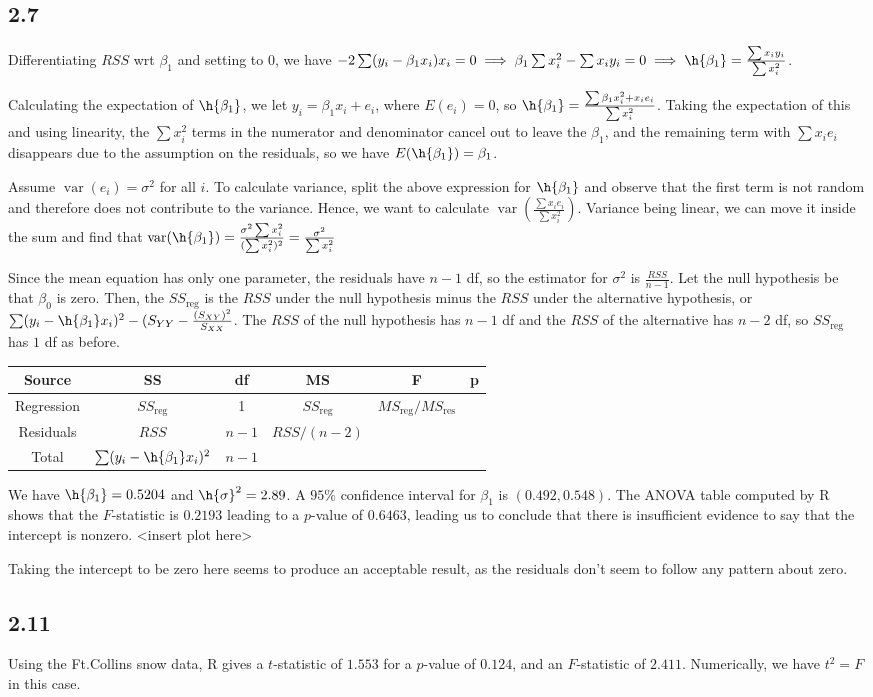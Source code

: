 \documentclass{article}
\DeclareMathOperator{\var}{var}
\begin{document}
\subsection*{2.7}
Differentiating $RSS$ wrt $\beta_1$ and setting to $0$, we have $-2\sum(y_i-\beta_1x_i)x_i=0\implies \beta_1\sum x_i^2-\sum x_iy_i=0\implies \h{\beta_1}=\frac{\sum x_iy_i}{\sum x_i^2}$.

Calculating the expectation of $\h{\beta_1}$, we let $y_i=\beta_1x_i+e_i$, where $E(e_i)=0$, so $\h{\beta_1}=\frac{\sum \beta_1x_i^2+x_ie_i}{\sum x_i^2}$. Taking the expectation of this and using linearity, the $\sum x_i^2$ terms in the numerator and denominator cancel out to leave the $\beta_1$, and the remaining term with $\sum x_ie_i$ disappears due to the assumption on the residuals, so we have $E(\h{\beta_1})=\beta_1$.

Assume $\var(e_i)=\sigma^2$ for all $i$. To calculate variance, split the above expression for $\h{\beta_1}$ and observe that the first term is not random and therefore does not contribute to the variance. Hence, we want to calculate $\var\left(\frac{\sum x_ie_i}{\sum x_i^2}\right)$. Variance being linear, we can move it inside the sum and find that $\var(\h{\beta_1})=\frac{\sigma^2\sum x_i^2}{(\sum x_i^2)^2}=\frac{\sigma^2}{\sum x_i^2}$

Since the mean equation has only one parameter, the residuals have $n-1$ df, so the estimator for $\sigma^2$ is $\frac{RSS}{n-1}$.
Let the null hypothesis be that $\beta_0$ is zero. Then, the $SS_\text{reg}$ is the $RSS$ under the null hypothesis minus the $RSS$ under the alternative hypothesis, or $\sum(y_i-\h{\beta_1}x_i)^2-(S_{YY}-\frac{(S_{XY})^2}{S_{XX}}$. The $RSS$ of the null hypothesis has $n-1$ df and the $RSS$ of the alternative has $n-2$ df, so $SS_\text{reg}$ has $1$ df as before. 

\begin{tabular}{cccccc}
\hline
Source & SS & df & MS & F & p\\
\hline
Regression & $SS_\text{reg}$ & 1 & $SS_\text{reg}$ & $MS_\text{reg}/MS_\text{res}$ & \\
Residuals & $RSS$ & $n-1$ & $RSS/(n-2)$ \\
Total & $\sum (y_i-\h{\beta_1}x_i)^2$ & $n-1$\\
\end{tabular}

We have $\h{\beta_1}=0.5204$ and $\h{\sigma}^2=2.89$. A $95\%$ confidence interval for $\beta_1$ is $(0.492,0.548)$. The ANOVA table computed by R shows that the $F$-statistic is $0.2193$ leading to a $p$-value of $0.6463$, leading us to conclude that there is insufficient evidence to say that the intercept is nonzero.
<insert plot here>

Taking the intercept to be zero here seems to produce an acceptable result, as the residuals don't seem to follow any pattern about zero.
\subsection*{2.11}
Using the Ft.Collins snow data, R gives a $t$-statistic of $1.553$ for a $p$-value of $0.124$, and an $F$-statistic of $2.411$. Numerically, we have $t^2=F$ in this case.
\end{document}

